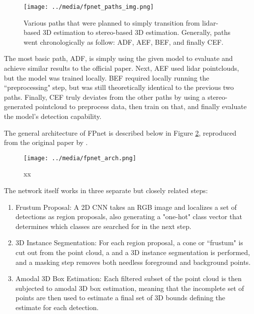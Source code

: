 \begin{figure}[H]
    \centering
    \texttt{[image: ../media/fpnet\_paths\_img.png]}
    \caption{Various paths that were planned to simply transition from lidar-based 3D estimation to stereo-based 3D estimation. Generally, paths went chronologically as follow: ADF, AEF, BEF, and finally CEF.}
    \label{fp_paths}
\end{figure}

The most basic path, ADF, is simply using the given model to evaluate and achieve similar results to the official paper. Next, AEF used lidar pointclouds, but the model was trained locally. BEF required locally running the ``preprocessing" step, but was still theoretically identical to the previous two paths. Finally, CEF truly deviates from the other paths by using a stereo-generated pointcloud to preprocess data, then train on that, and finally evaluate the model's detection capability.

The general architecture of FPnet is described below in Figure \ref{fpnet_arch}, reproduced from the original paper by \cite{qi_frustum_2017}. 

\begin{figure}[H]
    \centering
    \texttt{[image: ../media/fpnet\_arch.png]}
    \caption{xx}
    \label{fpnet_arch}
\end{figure}

The network itself works in three separate but closely related steps: 
\begin{enumerate}
    \item Frustum Proposal: A 2D CNN takes an RGB image and localizes a set of detections as region proposals, also generating a "one-hot" class vector that determines which classes are searched for in the next step.
    \item 3D Instance Segmentation: For each region proposal, a cone or ``frustum" is cut out from the point cloud, a and a 3D instance segmentation is performed, and a masking step removes both needless foreground and background points.
    \item Amodal 3D Box Estimation: Each filtered subset of the point cloud is then subjected to amodal 3D box estimation, meaning that the incomplete set of points are then used to estimate a final set of 3D bounds defining the estimate for each detection.
\end{enumerate}







